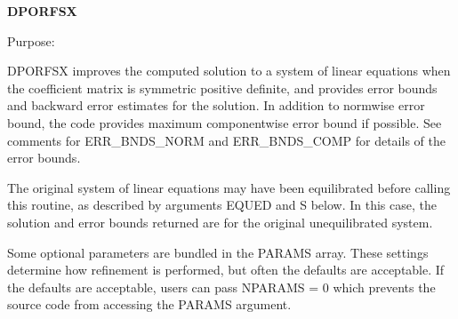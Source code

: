 {\bfseries D\+P\+O\+R\+F\+S\+X} 

 \begin{DoxyParagraph}{Purpose\+: }
\begin{DoxyVerb}    DPORFSX improves the computed solution to a system of linear
    equations when the coefficient matrix is symmetric positive
    definite, and provides error bounds and backward error estimates
    for the solution.  In addition to normwise error bound, the code
    provides maximum componentwise error bound if possible.  See
    comments for ERR_BNDS_NORM and ERR_BNDS_COMP for details of the
    error bounds.

    The original system of linear equations may have been equilibrated
    before calling this routine, as described by arguments EQUED and S
    below. In this case, the solution and error bounds returned are
    for the original unequilibrated system.\end{DoxyVerb}
 \begin{DoxyVerb}     Some optional parameters are bundled in the PARAMS array.  These
     settings determine how refinement is performed, but often the
     defaults are acceptable.  If the defaults are acceptable, users
     can pass NPARAMS = 0 which prevents the source code from accessing
     the PARAMS argument.\end{DoxyVerb}

\end{DoxyParagraph}

